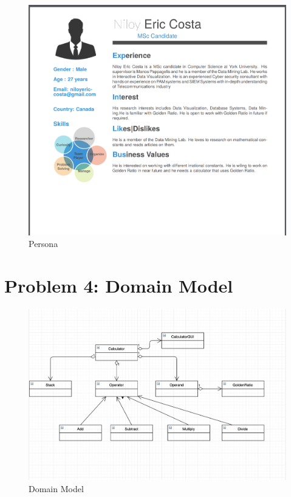 \documentclass[12pt]{extarticle}
\begin{document}
\begin{figure}[htb!]
  
  \includegraphics[width=1\textwidth]{niloy.png}
  \centering
  \caption{Persona}
\end{figure}

\newpage
\section{Problem 4: Domain Model}
\begin{figure}[htb!]
  \includegraphics[width=1\textwidth]{domainmodel.png}
  \centering
  \caption{Domain Model}
\end{figure}
\end{document}
